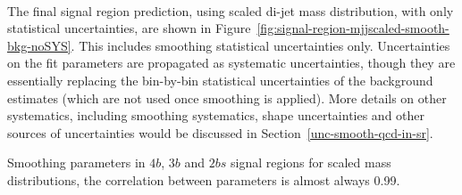 \paragraph{}
The final signal region prediction, using scaled di-jet mass distribution, with only statistical uncertainties, are shown in Figure~\ref{fig:signal-region-mjjscaled-smooth-bkg-noSYS}. 
This includes smoothing statistical uncertainties only. 
Uncertainties on the fit parameters are propagated as systematic uncertainties, though they are essentially replacing the bin-by-bin statistical uncertainties of the background estimates (which are not used once smoothing is applied).
More details on other systematics, including smoothing systematics, shape uncertainties and other sources of uncertainties would be discussed in Section~\ref{unc-smooth-qcd-in-sr}.

\begin{table}[htb!]
\begin{center}
\caption{Smoothing parameters in $4b$, $3b$ and $2bs$ signal regions for scaled mass distributions, the correlation between parameters is almost always 0.99.}

\label{tab:smoothparams_pole}
\end{center}
\end{table}

